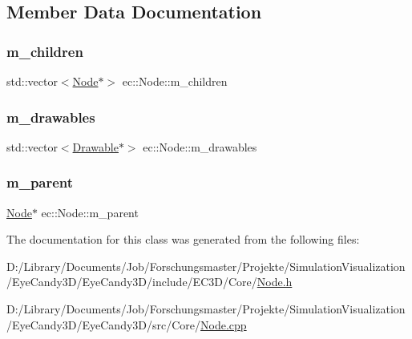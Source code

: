 \subsection{Member Data Documentation}
\mbox{\label{classec_1_1_node_a648e1758013c7fc5899cbff2f8fe41fa}} 
\subsubsection{\texorpdfstring{m\+\_\+children}{m\_children}}
{\footnotesize\ttfamily std\+::vector$<$\mbox{\hyperlink{classec_1_1_node}{Node}}$\ast$$>$ ec\+::\+Node\+::m\+\_\+children\hspace{0.3cm}{\ttfamily [protected]}}

\mbox{\label{classec_1_1_node_aa9f624971a4906674148117ba4442c01}} 
\subsubsection{\texorpdfstring{m\+\_\+drawables}{m\_drawables}}
{\footnotesize\ttfamily std\+::vector$<$\mbox{\hyperlink{classec_1_1_drawable}{Drawable}}$\ast$$>$ ec\+::\+Node\+::m\+\_\+drawables\hspace{0.3cm}{\ttfamily [protected]}}

\mbox{\label{classec_1_1_node_a9f5373bd3ba5bfed53894223adcfe791}} 
\subsubsection{\texorpdfstring{m\+\_\+parent}{m\_parent}}
{\footnotesize\ttfamily \mbox{\hyperlink{classec_1_1_node}{Node}}$\ast$ ec\+::\+Node\+::m\+\_\+parent\hspace{0.3cm}{\ttfamily [protected]}}



The documentation for this class was generated from the following files\+:\begin{DoxyCompactItemize}
\item 
D\+:/\+Library/\+Documents/\+Job/\+Forschungsmaster/\+Projekte/\+Simulation\+Visualization/\+Eye\+Candy3\+D/\+Eye\+Candy3\+D/include/\+E\+C3\+D/\+Core/\mbox{\hyperlink{_node_8h}{Node.\+h}}\item 
D\+:/\+Library/\+Documents/\+Job/\+Forschungsmaster/\+Projekte/\+Simulation\+Visualization/\+Eye\+Candy3\+D/\+Eye\+Candy3\+D/src/\+Core/\mbox{\hyperlink{_node_8cpp}{Node.\+cpp}}\end{DoxyCompactItemize}
